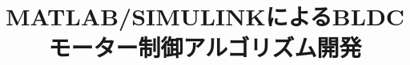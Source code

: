 \documentclass[uplatex,a4paper,twoside,10pt]{jsarticle}
\begin{document}
\title{MATLAB/SIMULINKによるBLDCモーター制御アルゴリズム開発}

\maketitle

\tableofcontents

\newpage

%
%
%

%
%
%






\end{document}
